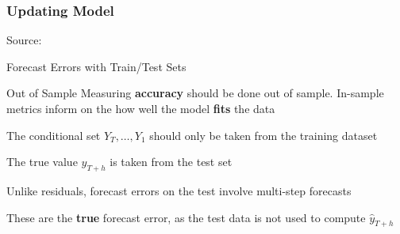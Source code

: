 \documentclass{beamer}
\newenvironment{wideitemize}{\itemize\addtolength{\itemsep}{10pt}}{\enditemize}
\begin{document}
\begin{frame}
  \frametitle{Updating Model}
  \hspace*{15pt}\hbox{\scriptsize Source:}
\end{frame}


\begin{frame}{Forecast Errors with Train/Test Sets}

  \begin{alertblock}{Out of Sample}
    Measuring \textbf{accuracy} should be done out of sample. In-sample metrics inform on the how well the model \textbf{fits} the data
  \end{alertblock}
  
\begin{wideitemize}
    \item The conditional set $Y_T, \dots, Y_1$ should only be taken from the training dataset
    \item The true value $y_{T+h}$ is taken from the test set
    \item Unlike residuals, forecast errors on the test involve multi-step forecasts
    \item These are the \textbf{true} forecast error, as the test data is not used to compute $\hat{y}_{T+h}$
  \end{wideitemize}
  
\end{frame}
\end{document}
